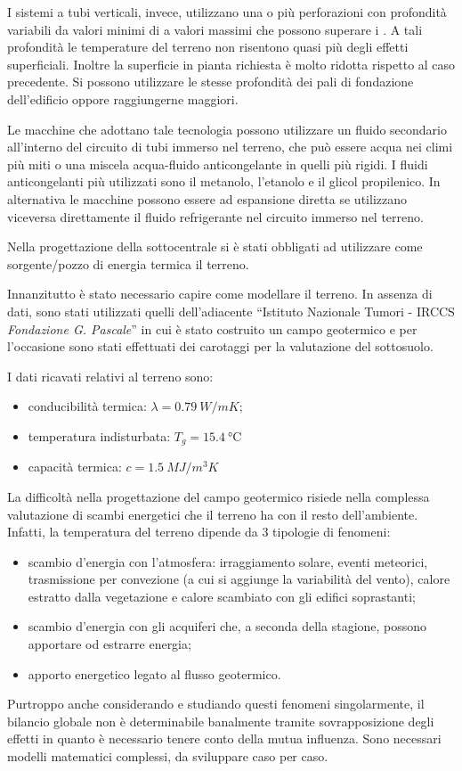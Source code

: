 I sistemi a tubi verticali, invece, utilizzano una o più perforazioni con profondità variabili da valori minimi di  a valori massimi che possono superare i . A tali profondità le temperature del terreno non risentono quasi più degli effetti superficiali. Inoltre la superficie in pianta richiesta è molto ridotta rispetto al caso precedente. Si possono utilizzare le stesse profondità dei pali di fondazione dell'edificio oppore raggiungerne maggiori. 

Le macchine che adottano tale tecnologia possono utilizzare un fluido secondario all'interno del circuito di tubi immerso nel terreno, che può essere acqua nei climi più miti o una miscela acqua-fluido anticongelante in quelli più rigidi. I fluidi anticongelanti più utilizzati sono il metanolo, l'etanolo e il glicol propilenico. In alternativa le macchine possono essere ad espansione diretta se utilizzano viceversa direttamente il fluido refrigerante nel circuito immerso nel terreno.

Nella progettazione della sottocentrale si è stati obbligati ad utilizzare come sorgente/pozzo di energia termica il terreno.

Innanzitutto è stato necessario capire come modellare il terreno. In assenza di dati, sono stati utilizzati quelli dell'adiacente ``Istituto Nazionale Tumori - IRCCS \emph{Fondazione G. Pascale}'' in cui è stato costruito un campo geotermico e per l'occasione sono stati effettuati dei carotaggi per la valutazione del sottosuolo.

I dati ricavati relativi al terreno sono:
\begin{itemize}
	\item conducibilità termica: $\lambda = \SI{0.79}{W/mK}$;
	\item temperatura indisturbata: $T_g=\SI{15.4}{\degreeCelsius}$
	\item capacità termica: $c=\SI{1.5}{MJ/m^3K}$
\end{itemize}

La difficoltà nella progettazione del campo geotermico risiede nella complessa valutazione di scambi energetici che il terreno ha con il resto dell'ambiente. Infatti, la temperatura del terreno dipende da 3 tipologie di fenomeni:
\begin{itemize}
	\item scambio d'energia con l'atmosfera: irraggiamento solare, eventi meteorici, trasmissione per convezione (a cui si aggiunge la variabilità del vento), calore estratto dalla vegetazione e calore scambiato con gli edifici soprastanti;
	\item scambio d'energia con gli acquiferi che, a seconda della stagione, possono apportare od estrarre energia;
	\item apporto energetico legato al flusso geotermico.
\end{itemize}
Purtroppo anche considerando e studiando questi fenomeni singolarmente, il bilancio globale non è determinabile banalmente tramite sovrapposizione degli effetti in quanto è necessario tenere conto della mutua influenza. Sono necessari modelli matematici complessi, da sviluppare caso per caso.

